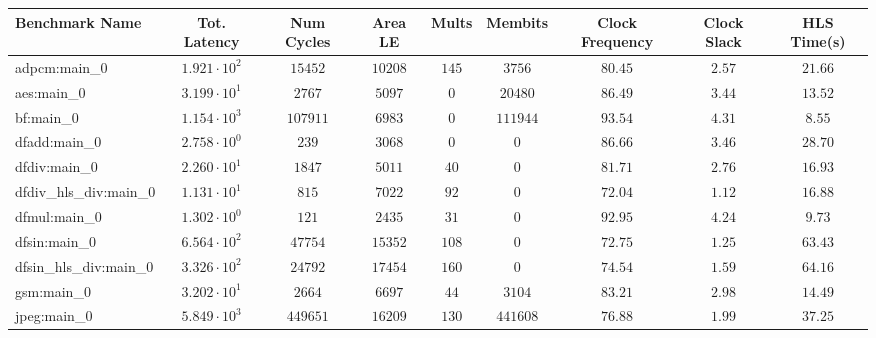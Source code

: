 \begin{tabular}{|l|c|c|c|c|c|c|c|c|}
\hline
Benchmark Name          & Tot. Latency           & Num Cycles & Area LE    & Mults   & Membits    & Clock Frequency & Clock Slack & HLS Time(s) \\
\hline
adpcm:main\_0           & $ 1.921 \cdot 10^{2} $ & $ 15452  $ & $ 10208  $ & $ 145 $ & $ 3756   $ & $ 80.45       $ & $ 2.57    $ & $ 21.66   $ \\
aes:main\_0             & $ 3.199 \cdot 10^{1} $ & $ 2767   $ & $ 5097   $ & $ 0   $ & $ 20480  $ & $ 86.49       $ & $ 3.44    $ & $ 13.52   $ \\
bf:main\_0              & $ 1.154 \cdot 10^{3} $ & $ 107911 $ & $ 6983   $ & $ 0   $ & $ 111944 $ & $ 93.54       $ & $ 4.31    $ & $ 8.55    $ \\
dfadd:main\_0           & $ 2.758 \cdot 10^{0} $ & $ 239    $ & $ 3068   $ & $ 0   $ & $ 0      $ & $ 86.66       $ & $ 3.46    $ & $ 28.70   $ \\
dfdiv:main\_0           & $ 2.260 \cdot 10^{1} $ & $ 1847   $ & $ 5011   $ & $ 40  $ & $ 0      $ & $ 81.71       $ & $ 2.76    $ & $ 16.93   $ \\
dfdiv\_hls\_div:main\_0 & $ 1.131 \cdot 10^{1} $ & $ 815    $ & $ 7022   $ & $ 92  $ & $ 0      $ & $ 72.04       $ & $ 1.12    $ & $ 16.88   $ \\
dfmul:main\_0           & $ 1.302 \cdot 10^{0} $ & $ 121    $ & $ 2435   $ & $ 31  $ & $ 0      $ & $ 92.95       $ & $ 4.24    $ & $ 9.73    $ \\
dfsin:main\_0           & $ 6.564 \cdot 10^{2} $ & $ 47754  $ & $ 15352  $ & $ 108 $ & $ 0      $ & $ 72.75       $ & $ 1.25    $ & $ 63.43   $ \\
dfsin\_hls\_div:main\_0 & $ 3.326 \cdot 10^{2} $ & $ 24792  $ & $ 17454  $ & $ 160 $ & $ 0      $ & $ 74.54       $ & $ 1.59    $ & $ 64.16   $ \\
gsm:main\_0             & $ 3.202 \cdot 10^{1} $ & $ 2664   $ & $ 6697   $ & $ 44  $ & $ 3104   $ & $ 83.21       $ & $ 2.98    $ & $ 14.49   $ \\
jpeg:main\_0            & $ 5.849 \cdot 10^{3} $ & $ 449651 $ & $ 16209  $ & $ 130 $ & $ 441608 $ & $ 76.88       $ & $ 1.99    $ & $ 37.25   $ \\

\end{tabular}

